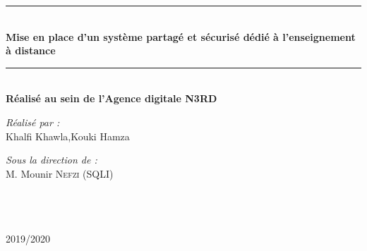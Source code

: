 \begin{titlepage}
\begin{center}
\rule{\linewidth}{0.3mm} \\[0.4cm]
{ \huge \bfseries\color{blue!70!black} Mise en place d'un système partagé et sécurisé
	dédié à l’enseignement à distance \\[0.4cm] }
\rule{\linewidth}{0.3mm} \\[0.4cm]
{\large \bfseries Réalisé au sein de l'Agence digitale N3RD}\\[0.5cm]
 \noindent
\begin{minipage}{0.4\textwidth}
  \begin{flushleft} \large
    \emph{\color{orange!80!black}Réalisé par :}\\
    Khalfi Khawla,Kouki Hamza \\
  \end{flushleft}
\end{minipage}%
\begin{minipage}{0.5\textwidth}
  \begin{flushright} \large
    \emph{\color{orange!80!black}Sous la direction de :} \\
    M. Mounir \textsc{Nefzi} (SQLI)\\
  \end{flushright}
\end{minipage}\\[3cm]




\\[0.5cm]

{\large \color{orange!80!black}{Année universitaire}\\ \color{blue!80!black}2019/2020}

\end{center}
\end{titlepage}
